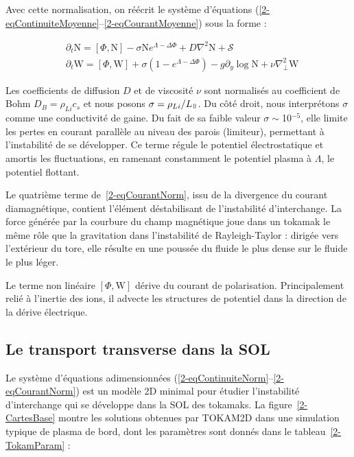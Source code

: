 \begin{refsection}
Avec cette normalisation, on
réécrit le système d'équations
(\eqref{2-eqContinuiteMoyenne}--\eqref{2-eqCourantMoyenne}) sous la forme :

\begin{align}
\label{2-eqContinuiteNorm}
&\partial_t \text{N}
= \left[\Phi,\text{N}\right] -\sigma \text{N}e^{\Lambda-\Delta\Phi}
 + D\nabla^2 \text{N} + \mathcal{S}
\\
\label{2-eqCourantNorm}
&\partial_{t}\text{W} = 
\left[\Phi,\text{W}\right]
+\sigma\left(1-e^{\Lambda-\Delta\Phi}\right) 
-g\partial_y\log\text{N}
+\nu\nabla_\perp^2\text{W}
\end{align}
 
Les coefficients de diffusion $D$ et de viscosité $\nu$ sont normalisés au
coefficient de Bohm $D_B=\rho_{Li}c_s$ et nous posons
$\sigma=\rho_{Li}/L_\para$. Du côté droit, nous interprétons $\sigma$
comme une conductivité de gaine. Du fait de sa faible valeur
$\sigma\sim$10$^{-5}$, elle limite les pertes en courant parallèle au niveau des
parois (limiteur), permettant à l'instabilité de se développer. Ce terme régule
le potentiel électrostatique et amortis les fluctuations, en ramenant constamment
le potentiel plasma à $\Lambda$, le potentiel flottant.

Le quatrième terme de~\eqref{2-eqCourantNorm}, issu de la divergence
du courant diamagnétique, contient l'élément déstabilisant de
 l'instabilité d'interchange. La force générée par la courbure du champ
 magnétique joue dans un tokamak le même rôle que la gravitation dans
 l'instabilité de Rayleigh-Taylor : dirigée vers l'extérieur du tore, elle 
 résulte en une poussée du fluide le plus dense sur le fluide le plus léger. 
 
 Le terme non linéaire $[\Phi,\text{W}]$ dérive du courant de polarisation.
 Principalement relié à l'inertie des ions, il advecte les structures de
 potentiel dans la direction de la dérive électrique.
 

\subsection{Le transport transverse dans la SOL}

Le système d'équations
adimensionnées (\eqref{2-eqContinuiteNorm}--\eqref{2-eqCourantNorm}) est un
modèle 2D minimal pour étudier l'instabilité d'interchange qui se développe dans
la SOL des tokamaks. La figure~\ref{2-CartesBase} montre les solutions obtenues
par TOKAM2D dans une simulation typique de plasma de bord, dont les paramètres
sont donnés dans le tableau~\ref{2-TokamParam} :


\end{refsection}
